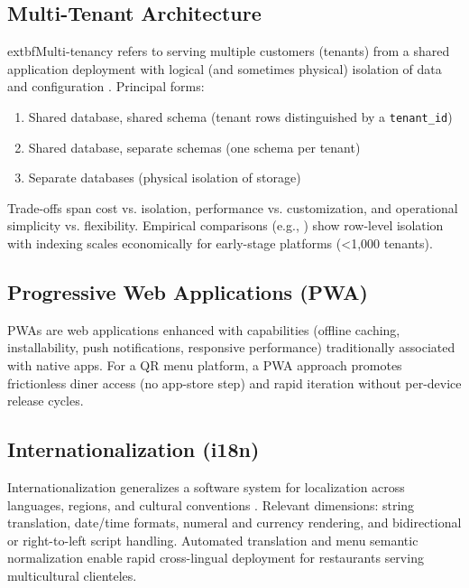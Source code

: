 \subsection{Multi-Tenant Architecture}
	extbf{Multi-tenancy} refers to serving multiple customers (tenants) from a shared application deployment with logical (and sometimes physical) isolation of data and configuration \cite{chong2006}. Principal forms:
\begin{enumerate}[label=\alph*)]
  \item Shared database, shared schema (tenant rows distinguished by a \texttt{tenant\_id})
  \item Shared database, separate schemas (one schema per tenant)
  \item Separate databases (physical isolation of storage)
\end{enumerate}
Trade-offs span cost vs. isolation, performance vs. customization, and operational simplicity vs. flexibility. Empirical comparisons (e.g., \cite{guo2020}) show row-level isolation with indexing scales economically for early-stage platforms (\textless{}1{,}000 tenants).

\subsection{Progressive Web Applications (PWA)}
PWAs are web applications enhanced with capabilities (offline caching, installability, push notifications, responsive performance) traditionally associated with native apps. For a QR menu platform, a PWA approach promotes frictionless diner access (no app-store step) and rapid iteration without per-device release cycles.

\subsection{Internationalization (i18n)}
Internationalization generalizes a software system for localization across languages, regions, and cultural conventions \cite{unicode2023}. Relevant dimensions: string translation, date/time formats, numeral and currency rendering, and bidirectional or right-to-left script handling. Automated translation and menu semantic normalization enable rapid cross-lingual deployment for restaurants serving multicultural clienteles.

